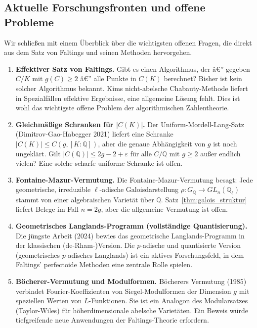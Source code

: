 ﻿\documentclass[12pt,a4paper]{article}
\theoremstyle{plain}
\theoremstyle{definition}
\theoremstyle{remark}
\newcommand{\Q}{\mathbb{Q}}
\begin{document}
\subsection{Aktuelle Forschungsfronten und offene Probleme}

Wir schließen mit einem Überblick über die wichtigsten offenen Fragen, die direkt
aus dem Satz von Faltings und seinen Methoden hervorgehen.

\begin{enumerate}[leftmargin=2em,itemsep=6pt, label=\textbf{(\arabic*)}]
  \item \textbf{Effektiver Satz von Faltings.}
    Gibt es einen Algorithmus, der â€” gegeben $C/K$ mit $g(C) \geq 2$ â€”
    alle Punkte in $C(K)$ berechnet? Bisher ist kein solcher Algorithmus bekannt.
    Kims nicht-abelsche Chabauty-Methode liefert in Spezialfällen effektive Ergebnisse,
    eine allgemeine Lösung fehlt. Dies ist wohl das wichtigste offene Problem
    der algorithmischen Zahlentheorie.

  \item \textbf{Gleichmäßige Schranken für $|C(K)|$.}
    Der Uniform-Mordell-Lang-Satz (Dimitrov-Gao-Habegger 2021) liefert eine
    Schranke $|C(K)| \leq C(g, [K:\Q])$, aber die genaue Abhängigkeit von $g$
    ist noch ungeklärt. Gilt $|C(\Q)| \leq 2g - 2 + \varepsilon$ für alle
    $C/\Q$ mit $g \geq 2$ außer endlich vielen? Eine solche scharfe uniforme Schranke
    ist offen.

  \item \textbf{Fontaine-Mazur-Vermutung.}
    Die Fontaine-Mazur-Vermutung besagt: Jede geometrische, irreduzible
    $\ell$-adische Galoisdarstellung $\rho: G_\Q \to GL_n(\Q_\ell)$
    stammt von einer algebraischen Varietät über $\Q$. Satz~\ref{thm:galois_struktur}
    liefert Belege im Fall $n = 2g$, aber die allgemeine Vermutung ist offen.

  \item \textbf{Geometrisches Langlands-Programm (vollständige Quantisierung).}
    Die jüngste Arbeit (2024) bewies das geometrische Langlands-Programm in der
    klassischen (de-Rham-)Version. Die $p$-adische und quantisierte Version
    (geometrisches $p$-adisches Langlands) ist ein aktives Forschungsfeld, in dem
    Faltings' perfectoide Methoden eine zentrale Rolle spielen.

  \item \textbf{Böcherer-Vermutung und Modulformen.}
    Böcherers Vermutung (1985) verbindet Fourier-Koeffizienten von
    Siegel-Modulformen der Dimension $g$ mit speziellen Werten von
    $L$-Funktionen. Sie ist ein Analogon des Modularsatzes (Taylor-Wiles)
    für höherdimensionale abelsche Varietäten. Ein Beweis würde tiefgreifende
    neue Anwendungen der Faltings-Theorie erfordern.


\end{enumerate}
\end{document}
